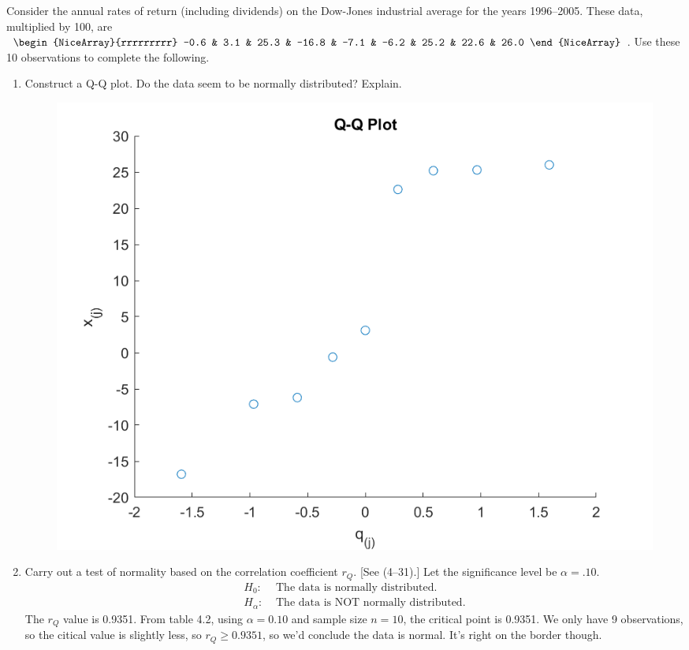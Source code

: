 Consider the annual rates of return (including dividends) on the Dow-Jones
industrial average for the years 1996--2005. These data, multiplied by 100, are
$\begin{NiceArray}{rrrrrrrrr}
    -0.6 & 3.1 & 25.3 & -16.8 & -7.1 & -6.2 & 25.2 & 22.6 & 26.0
\end{NiceArray}$.
\newline
Use these 10 observations to complete the following.
\begin{enumerate}[label= (\alph*)]
    \item Construct a Q-Q plot. Do the data seem to be normally distributed? Explain.
    \begin{figure}[H]
        \includegraphics[scale=0.8]{./matlab/chapter-4/sol4.23a.png}
    \end{figure}
    \item Carry out a test of normality based on the correlation coefficient $r_{Q}$. [See (4--31).]
    Let the significance level be $\alpha = .10$.
    \begin{equation*}
        \begin{aligned}
            H_{0}: & \text{\ The data is normally distributed.} \\
            H_{\alpha}: & \text{\ The data is NOT normally distributed.}
        \end{aligned}
    \end{equation*}
    The $r_{Q}$ value is 0.9351. From table 4.2, using $\alpha = 0.10$ and sample size $n = 10$, the critical point is 0.9351. We only have 9 observations, so the citical value is slightly less, so $r_{Q} \geq 0.9351$, so we'd conclude the data is normal. It's right on the border though.

\end{enumerate}
